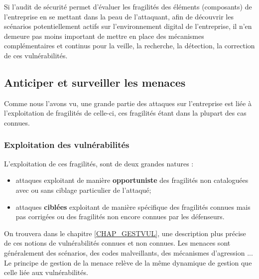 Si l'audit de sécurité permet d'évaluer les fragilités des éléments (composants) de l'entreprise en se mettant dans la peau de l'attaquant, afin de découvrir les scénarios potentiellement actifs sur l'environnement digital de l'entreprise, il n'en demeure pas moins important de mettre en place des mécanismes complémentaires et continus pour la veille, la recherche, la détection, la correction de ces vulnérabilités.


\subsection{Anticiper et surveiller les menaces }

Comme nous l'avons vu, une grande partie des attaques sur l'entreprise est liée à l'exploitation de fragilités de celle-ci, ces fragilités étant dans la plupart des cas connues.  

\begin{frame}
\frametitle<presentation>{Exploitation des vulnérabilités}
L'exploitation de ces fragilités, sont de deux grandes natures :
\begin{itemize}
	\item attaques exploitant de manière \textbf{opportuniste} des fragilités non cataloguées  avec ou sans ciblage particulier de l'attaqué;
	\item attaques \textbf{ciblées} exploitant de manière spécifique des fragilités connues mais pas corrigées ou des fragilités non encore connues par les défenseurs.
\end{itemize}
\end{frame}

On trouvera dans le chapitre \ref{CHAP_GESTVUL}, une description plus précise de ces notions de vulnérabilités connues et non connues. Les menaces sont généralement des scénarios, des codes malveillants, des mécanismes d'agression ...
Le principe de gestion de la menace relève de la même dynamique de gestion que celle liée aux vulnérabilités. 



